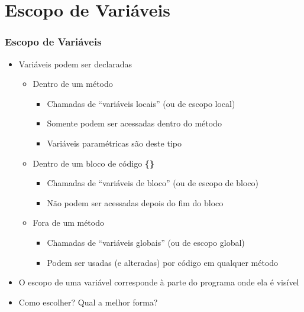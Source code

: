 \documentclass[xcolor={dvipsnames,table},aspectratio=169]{beamer}
\begin{document}
\section{Escopo de Variáveis}

\begin{frame}\frametitle{Escopo de Variáveis}
\begin{itemize}
	\item Variáveis podem ser declaradas
	\begin{itemize}
		\item Dentro de um método
		\begin{itemize}
			\item Chamadas de ``variáveis locais'' (ou de escopo local)
			\item Somente podem ser acessadas dentro do método
			\item Variáveis paramétricas são deste tipo
		\end{itemize}
		\item Dentro de um bloco de código \textbf{\{\}}
		\begin{itemize}
			\item Chamadas de ``variáveis de bloco'' (ou de escopo de bloco)
			\item Não podem ser acessadas depois do fim do bloco
		\end{itemize}
		\item Fora de um método
		\begin{itemize}
			\item Chamadas de ``variáveis globais'' (ou de escopo global)
			\item Podem ser usadas (e alteradas) por código em qualquer método
		\end{itemize}
	\end{itemize}
	\item O escopo de uma variável corresponde à parte do programa onde ela é visível
	\item Como escolher? Qual a melhor forma?
\end{itemize}
\end{frame}
\end{document}
